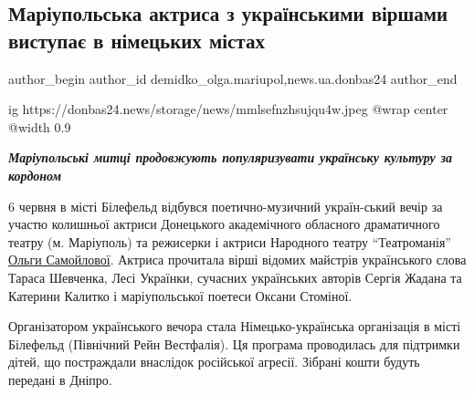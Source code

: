  
 
 
 
 
 
\subsection{Маріупольська актриса з українськими віршами виступає в німецьких містах}
\label{sec:08_06_2023.stz.news.ua.donbas24.1.mariupol_aktrisa_virshi_nimecchyna_vystupy_olga_samojlova}
 
\ifcmt
 author_begin
   author_id demidko_olga.mariupol,news.ua.donbas24
 author_end
\fi

\ifcmt
	ig https://donbas24.news/storage/news/mmlsefnzhsujqu4w.jpeg
  @wrap center
  @width 0.9
\fi

\begin{center}
  \em\color{blue}\bfseries\Large
Маріупольські митці продовжують популяризувати українську культуру за
кордоном 
\end{center}

6 червня в місті Білефельд відбувся поетично-музичний україн\hyp{}ський вечір за
участю колишньої актриси Донецького академічного обласного драматичного театру
(м. Маріуполь) та режисерки і актриси Народного театру \enquote{Театроманія}
\href{https://www.facebook.com/profile.php?id=100001752890543}{Ольги
Самойлової}. Актриса прочитала вірші відомих майстрів українського слова Тараса
Шевченка, Лесі Українки, сучасних українських авторів Сергія Жадана та Катерини
Калитко і маріупольської поетеси Оксани Стоміної.


Організатором українського вечора стала Німецько-українська організація в місті
Білефельд (Північний Рейн Вестфалія). Ця програма проводилась для підтримки
дітей, що постраждали внаслідок російської агресії. Зібрані кошти будуть
передані в Дніпро. 

